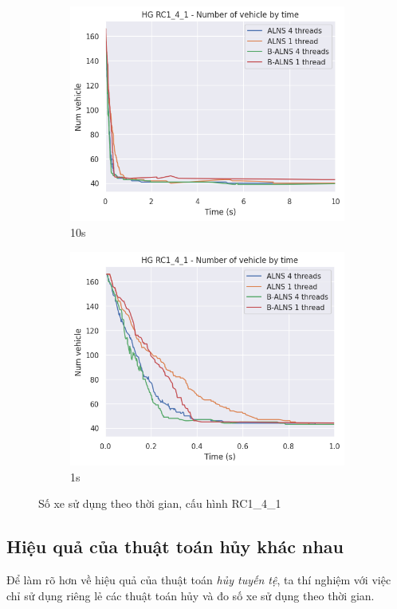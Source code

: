 \begin{figure}[H] %
  \label{fig:perf_ct_rc1}
  \begin{subfigure}{.5\textwidth}
    \centering
    \includegraphics[width=0.9\linewidth]{figures/nv_time_10s_RC1_4_1.png}
    \caption{10s}
    \label{fig:perf_ct_rc1_4_10s}
  \end{subfigure}%
  \begin{subfigure}{.5\textwidth}
    \centering
    \includegraphics[width=0.9\linewidth]{figures/nv_time_1s_RC1_4_1.png}
    \caption{1s}
    \label{fig:perf_ct_rc1_4_1s}
  \end{subfigure}
  \caption{Số xe sử dụng theo thời gian, cấu hình RC1\_4\_1}
\end{figure}

\subsection{Hiệu quả của thuật toán hủy khác nhau}
Để làm rõ hơn về hiệu quả của thuật toán \textit{hủy tuyến tệ}, ta thí nghiệm với việc chỉ sử dụng riêng lẻ các thuật toán hủy và đo số xe sử dụng theo thời gian. 

